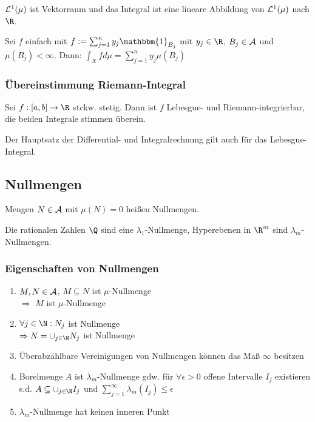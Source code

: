 $\mathcal{L}^1(\mu)$ ist Vektorraum und das Integral ist eine lineare Abbildung von $\mathcal{L}^1(\mu)$ nach $\R$.

\spacing

Sei $f$ einfach mit $f := \sum_{j=1}^n y_j \mathbbm{1}_{B_j}$ mit $y_j \in \R$, $B_j \in \mathcal{A}$ und $\mu(B_j) < \infty$. Dann: $\int_X f d\mu = \sum_{j=1}^n y_j \mu(B_j)$

\subsubsection*{Übereinstimmung Riemann-Integral}

Sei $f : [a,b] \to \R$ stckw. stetig. Dann ist $f$ Lebesgue- und Riemann-integrierbar, die beiden Integrale stimmen überein.

Der Hauptsatz der Differential- und Integralrechnung gilt auch für das Lebesgue-Integral.

\subsection*{Nullmengen}

Mengen $N \in \mathcal{A}$ mit $\mu(N) = 0$ heißen Nullmengen.

Die rationalen Zahlen $\Q$ sind eine $\lambda_1$-Nullmenge, Hyperebenen in $\R^m$ sind $\lambda_m$-Nullmengen.

\subsubsection*{Eigenschaften von Nullmengen}

\begin{enumerate}[label=(\alph*)]
	\item $M, N \in \mathcal{A}$, $M \subseteq N$ ist $\mu$-Nullmenge \\ $\Rightarrow$ $M$ ist $\mu$-Nullmenge
	\item $\forall j \in \N : N_j$ ist Nullmenge \\ $\Rightarrow N = \cup_{j \in \N} N_j$ ist Nullmenge
	\item Überabzählbare Vereinigungen von Nullmengen können das Maß $\infty$ besitzen
	\item Borelmenge $A$ ist $\lambda_m$-Nullmenge gdw. für $\forall \epsilon > 0$  offene Intervalle $I_j$ existieren s.d. $A \subseteq \cup_{j \in \N} I_j$ und $\sum_{j=1}^\infty \lambda_m(I_j) \leq \epsilon$
	\item $\lambda_m$-Nullmenge hat keinen inneren Punkt
\end{enumerate}

